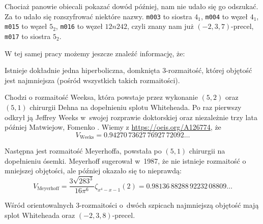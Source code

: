 Chociaż panowie obiecali pokazać dowód później, nam nie udało się go odszukać.
Za to udało się rozszyfrować niektóre nazwy.
\texttt{m003} to siostra $4_1$, %
\texttt{m004} to węzeł $4_1$, %
\texttt{m015} to węzeł $5_2$,
\texttt{m016} to węzeł $12n242$, czyli znany nam już $(-2, 3, 7)$-precel,
%
\texttt{m017} to siostra $5_2$. %

W tej samej pracy możemy jeszcze znaleźć informację, że:

\begin{proposition}
    Istnieje dokładnie jedna hiperboliczna, domknięta 3-rozmaitość, której objętość jest najmniejsza (pośród wszystkich takich rozmaitości).
\end{proposition}

Chodzi o rozmaitość Weeksa, która powstaje przez wykonanie $(5, 2)$ oraz $(5, 1)$ chirurgii Dehna na dopełnieniu splotu Whiteheada.
%
%
%
Po raz pierwszy odkrył ją Jeffrey Weeks \cite{weeks1985} w~swojej rozprawie doktorskiej oraz niezależnie trzy lata później Matwiejow, Fomenko \cite{fomenko1988}.
%
%
%
Wiemy z \url{https://oeis.org/A126774}, że
\begin{equation}
    V_{\textrm{Weeks}} = 0.94270 \, 73627 \, 76927 \, 72092 \ldots
\end{equation}

Następna jest rozmaitość Meyerhoffa, powstała po $(5, 1)$ chirurgii na dopełnieniu ósemki.
%
Meyerhoff sugerował w~1987, że nie istnieje rozmaitość o mniejszej objętości, ale później okazało się to nieprawdą: 
\begin{equation}
    V_{\textrm{Meyerhoff}} = \frac{ 3 \sqrt{283^3} } {16 \pi^6} \zeta_{x^4-x-1}(2) = 0.98136 \, 88288 \, 92232 \, 08809 \ldots
\end{equation}

\begin{proposition}
    Wśród orientowalnych 3-rozmaitości o~dwóch szpicach najmniejszą objętość mają splot Whiteheada oraz $(-2, 3, 8)$-precel.
%
%
%
\end{proposition}


